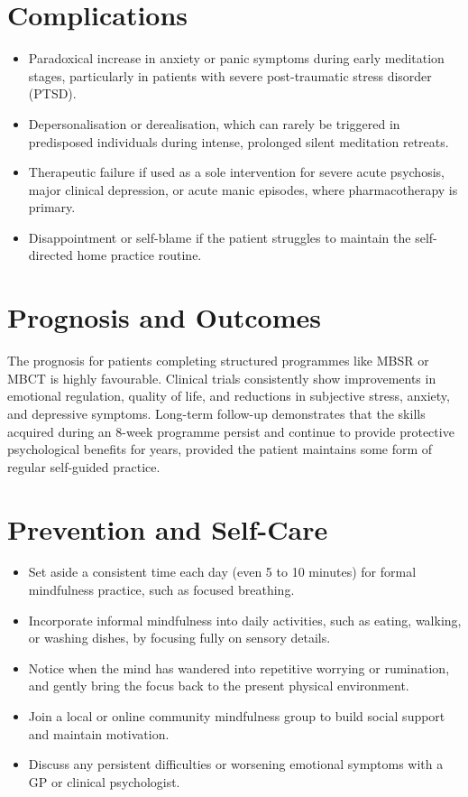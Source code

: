 \section*{Complications}
\begin{itemize}
    \item Paradoxical increase in anxiety or panic symptoms during early meditation stages, particularly in patients with severe post-traumatic stress disorder (PTSD).
    \item Depersonalisation or derealisation, which can rarely be triggered in predisposed individuals during intense, prolonged silent meditation retreats.
    \item Therapeutic failure if used as a sole intervention for severe acute psychosis, major clinical depression, or acute manic episodes, where pharmacotherapy is primary.
    \item Disappointment or self-blame if the patient struggles to maintain the self-directed home practice routine.
\end{itemize}

\section*{Prognosis and Outcomes}
The prognosis for patients completing structured programmes like MBSR or MBCT is highly favourable. Clinical trials consistently show improvements in emotional regulation, quality of life, and reductions in subjective stress, anxiety, and depressive symptoms. Long-term follow-up demonstrates that the skills acquired during an 8-week programme persist and continue to provide protective psychological benefits for years, provided the patient maintains some form of regular self-guided practice.

\section*{Prevention and Self-Care}
\begin{itemize}
    \item Set aside a consistent time each day (even 5 to 10 minutes) for formal mindfulness practice, such as focused breathing.
    \item Incorporate informal mindfulness into daily activities, such as eating, walking, or washing dishes, by focusing fully on sensory details.
    \item Notice when the mind has wandered into repetitive worrying or rumination, and gently bring the focus back to the present physical environment.
    \item Join a local or online community mindfulness group to build social support and maintain motivation.
    \item Discuss any persistent difficulties or worsening emotional symptoms with a GP or clinical psychologist.
\end{itemize}

